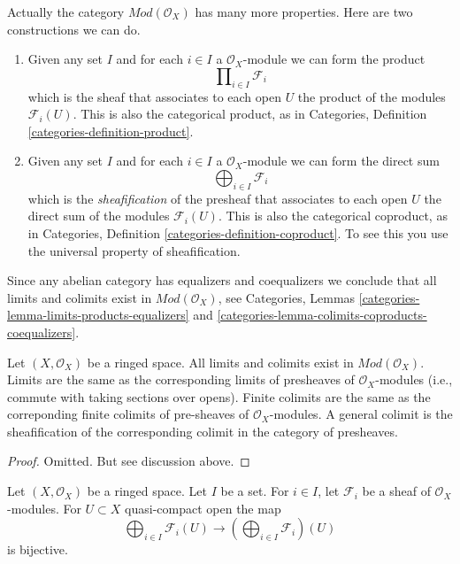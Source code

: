 \noindent
Actually the category $\textit{Mod}(\mathcal{O}_X)$ has many more properties.
Here are two constructions we can do.
\begin{enumerate}
\item Given any set $I$ and for each $i \in I$ a $\mathcal{O}_X$-module
we can form the product
$$
\prod\nolimits_{i \in I} \mathcal{F}_i
$$
which is the sheaf that associates to each open $U$ the
product of the modules $\mathcal{F}_i(U)$. This is also the
categorical product, as in
Categories, Definition \ref{categories-definition-product}.
\item Given any set $I$ and for each $i \in I$ a $\mathcal{O}_X$-module
we can form the direct sum
$$
\bigoplus\nolimits_{i \in I} \mathcal{F}_i
$$
which is the {\it sheafification} of the presheaf
that associates to each open $U$ the
direct sum of the modules $\mathcal{F}_i(U)$.
This is also the categorical coproduct, as in
Categories, Definition \ref{categories-definition-coproduct}.
To see this you use the universal property of sheafification.
\end{enumerate}
Since any abelian category has equalizers and coequalizers
we conclude that all limits and colimits exist in
$\textit{Mod}(\mathcal{O}_X)$, see
Categories, Lemmas
\ref{categories-lemma-limits-products-equalizers} and
\ref{categories-lemma-colimits-coproducts-coequalizers}.

\begin{lemma}
\label{lemma-limits-colimits}
Let $(X, \mathcal{O}_X)$ be a ringed space.
All limits and colimits exist in $\textit{Mod}(\mathcal{O}_X)$.
Limits are the same as the corresponding limits of presheaves of
$\mathcal{O}_X$-modules (i.e., commute with taking
sections over opens). Finite colimits are the same as the correponding
finite colimits of pre-sheaves of $\mathcal{O}_X$-modules.
A general colimit is the sheafification of the corresponding colimit in
the category of presheaves.
\end{lemma}

\begin{proof}
Omitted. But see discussion above.
\end{proof}

\begin{lemma}
\label{lemma-section-direct-sum-quasi-compact}
Let $(X, \mathcal{O}_X)$ be a ringed space.
Let $I$ be a set. For $i \in I$, let $\mathcal{F}_i$
be a sheaf of $\mathcal{O}_X$-modules.
For $U \subset X$ quasi-compact open the map
$$
\bigoplus\nolimits_{i \in I} \mathcal{F}_i(U)
\longrightarrow
\left(\bigoplus\nolimits_{i \in I} \mathcal{F}_i\right)(U)
$$
is bijective.
\end{lemma}

